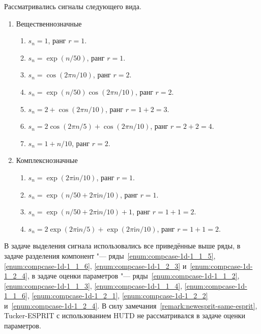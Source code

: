 \documentclass[specialist,
  substylefile = spbu.rtx,
subf,href,colorlinks=true, 12pt]{disser}
\theoremstyle{plain}
\theoremstyle{definition}
\theoremstyle{remark}
\newcommand{\iu}{\mathrm{i}}
\def\tesprit/{Tucker-ESPRIT}
\begin{document}
Рассматривались сигналы следующего вида.
\begin{enumerate}[ref=\arabic{enumi}]
  \item Вещественнозначные
    \begin{enumerate}[ref=\arabic{enumi}.\arabic{enumii}]
      \item\label{enum:compcase-1d-1_1_1} $s_n = 1$, ранг $r = 1$.
      \item\label{enum:compcase-1d-1_1_2} $s_n =\exp(n / 50)$, ранг $r = 1$.
      \item\label{enum:compcase-1d-1_1_3} $s_n = \cos(2\pi n /
        10)$, ранг $r = 2$.
      \item\label{enum:compcase-1d-1_1_4} $s_n = \exp(n / 50)
        \cos(2 \pi n / 10)$, ранг $r = 2$.
      \item\label{enum:compcase-1d-1_1_5} $s_n = 2 + \cos(2 \pi n /
        10)$, ранг $r = 1 + 2 = 3$.
      \item\label{enum:compcase-1d-1_1_6} $s_n = 2 \cos(2 \pi n /
        5) + \cos(2 \pi n / 10)$, ранг
        $r = 2 + 2 = 4$.
      \item\label{enum:compcase-1d-1_1_7} $s_n = 1 + n / 10$, ранг $r = 2$.
    \end{enumerate}
  \item Комплекснозначные
    \begin{enumerate}[ref=\arabic{enumi}.\arabic{enumii}]
      \item\label{enum:compcase-1d-1_2_1} $s_n = \exp(2 \pi \iu n /
        10)$, ранг $r = 1$.
      \item\label{enum:compcase-1d-1_2_2} $s_n = \exp(n / 50 + 2
        \pi \iu n / 10)$, ранг $r = 1$.
      \item\label{enum:compcase-1d-1_2_3} $s_n = \exp(n / 50 + 2
        \pi \iu n / 10) + 1$, ранг $r = 1 + 1 = 2$.
      \item\label{enum:compcase-1d-1_2_4} $s_n = 2 \exp(2 \pi \iu n
        / 5) + \exp(2 \pi \iu n /
        10)$, ранг $r = 1 + 1 = 2$.
    \end{enumerate}
\end{enumerate}
В задаче выделения сигнала использовались все приведённые выше ряды,
в задаче разделения компонент "---
ряды~\ref{enum:compcase-1d-1_1_5}, \ref{enum:compcase-1d-1_1_6},
\ref{enum:compcase-1d-1_2_3} и~\ref{enum:compcase-1d-1_2_4}, в задаче
оценки параметров "---
ряды~\ref{enum:compcase-1d-1_1_2}, \ref{enum:compcase-1d-1_1_3},
\ref{enum:compcase-1d-1_1_4}, \ref{enum:compcase-1d-1_1_6},
\ref{enum:compcase-1d-1_2_1}, \ref{enum:compcase-1d-1_2_2}
и~\ref{enum:compcase-1d-1_2_4}. В силу
замечания~\ref{remark:newesprit-same-esprit}, \tesprit/ с
использованием HUTD не рассматривался в задаче оценки параметров.
\end{document}
